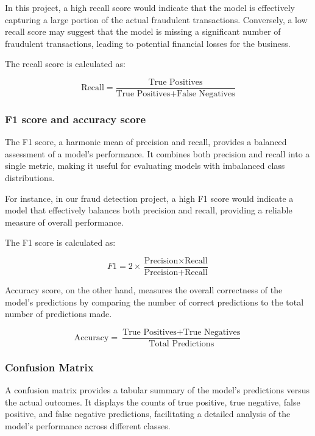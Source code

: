 \documentclass[conference]{IEEEtran}
\begin{document}
In this project, a high recall score would indicate that the model is effectively capturing a large portion of the actual fraudulent transactions. Conversely, a low recall score may suggest that the model is missing a significant number of fraudulent transactions, leading to potential financial losses for the business.

The recall score is calculated as:

\[ \text{Recall} = \frac{\text{True Positives}}{\text{True Positives} + \text{False Negatives}} \]

\subsubsection{F1 score and accuracy score}

The F1 score, a harmonic mean of precision and recall, provides a balanced assessment of a model's performance. It combines both precision and recall into a single metric, making it useful for evaluating models with imbalanced class distributions.

For instance, in our fraud detection project, a high F1 score would indicate a model that effectively balances both precision and recall, providing a reliable measure of overall performance.

The F1 score is calculated as:

\[ F1 = 2 \times \frac{\text{Precision} \times \text{Recall}}{\text{Precision} + \text{Recall}} \]

Accuracy score, on the other hand, measures the overall correctness of the model's predictions by comparing the number of correct predictions to the total number of predictions made.

\[ \text{Accuracy} = \frac{\text{True Positives} + \text{True Negatives}}{\text{Total Predictions}} \]

\subsubsection{Confusion Matrix}

A confusion matrix provides a tabular summary of the model's predictions versus the actual outcomes. It displays the counts of true positive, true negative, false positive, and false negative predictions, facilitating a detailed analysis of the model's performance across different classes.
\end{document}
